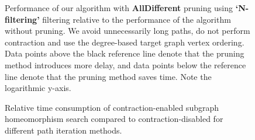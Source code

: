 \begin{figure}
\begin{subfigure} {0.5\linewidth}

\end{subfigure}

\caption{Performance of our algorithm with \textbf{AllDifferent} pruning using \textbf{`N-filtering'} filtering relative to the performance of the algorithm without pruning. We avoid unnecessarily long paths, do not perform contraction and use the degree-based target graph vertex ordering. Data points above the black reference line denote that the pruning method introduces more delay, and data points below the reference line denote that the pruning method saves time. Note the logarithmic y-axis.}		
\label{fig:test}
\end{figure}


\begin{figure}
\centering
{}
    \caption{Relative time consumption of contraction-enabled subgraph homeomorphism search compared to contraction-disabled for different path iteration methods.}
    \label{fig:contractionsmall}
\end{figure}


